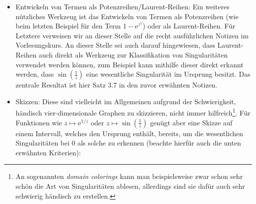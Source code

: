 \documentclass{article}
\theoremstyle{plain}
\theoremstyle{definition}
\begin{document}
\begin{itemize}
	      Hierfür kurz ein paar Beispiele: $\frac{1}{z^2}$ besitzt offensichtlicher Weise eine doppelte Polstelle bei $0$, da der Nenner dort eine doppelte Nullstelle besitzt und sich nichts wegkürzt.
	      $\frac{z - \mathrm{i}}{1 + z^2}$ besitzt, wie man nach Faktorisieren des Nenners gut sieht, zwar eine einfache Polstelle bei $-\mathrm{i}$, aber nur eine hebbare Singularität bei $\mathrm{i}$, da sich die einfache Nullstelle des Nenners bei $\mathrm{i}$ mit der des Zählers kürzt.
	      Die Funktion $\frac{z^2}{1 - \mathrm{e}^{z^5}}$ besitzt eine dreifache Polstelle bei $0$, da der Nenner eine fünffache Nullstelle bei $0$ besitzt (dies sieht man gut, wenn man den Nenner als Potenzreihe entwickelt), welche nach Kürzen mit der doppelten Nullstelle im Zähler nur noch wie behauptet eine dreifache Polstelle übrig lässt.
	\item Entwickeln von Termen als Potenzreihen/Laurent-Reihen: Ein weiteres nützliches Werkzeug ist das Entwickeln von Termen als Potenzreihen (wie beim letzten Beispiel für den Term $1 - \mathrm{e}^{z^5}$) oder als Laurent-Reihen.
	      Für Letztere verweisen wir an dieser Stelle auf die recht ausführlichen Notizen im Vorlesungskurs.
	      An dieser Stelle sei auch darauf hingewiesen, dass Laurent-Reihen auch direkt als Werkzeug zur Klassifikation von Singularitäten verwendet werden können, zum Beispiel kann mithilfe dieser direkt erkannt werden, dass $\sin(\frac{1}{z})$ eine wesentliche Singularität im Ursprung besitzt.
	      Das zentrale Resultat ist hier Satz 3.7 in den zuvor erwähnten Notizen.
	\item Skizzen: Diese sind vielleicht im Allgemeinen aufgrund der Schwierigkeit, händisch vier-dimensionale Graphen zu skizzieren, nicht immer hilfreich\footnote{An sogenannten \emph{domain colorings} kann man beispielsweise zwar schon sehr schön die Art von Singularitäten ablesen, allerdings sind sie dafür auch sehr schwierig händisch zu erstellen.}.
	      Für Funktionen wie $z \mapsto \mathrm{e}^{1/z}$ oder $z \mapsto \sin(\frac{1}{z})$ genügt aber eine Skizze auf einem Intervall, welches den Ursprung enthält, bereits, um die wesentlichen Singularitäten bei $0$ als solche zu erkennen (beachte hierfür auch die unten erwähnten Kriterien):
	      \begin{center}
\end{center}
\end{itemize}
\end{document}
